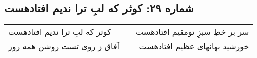 \begin{center}
\section*{شماره ۲۹: کوثر که لبِ ترا ندیم افتادهست}
\label{sec:029}
\begin{longtable}{l p{0.5cm} r}
کوثر که لبِ ترا ندیم افتادهست
&&
سر بر خطِ سبزِ تومقیم افتادهست
\\
آفاق ز روی تست روشن همه روز
&&
خورشید بهانهای عظیم افتادهست
\\
\end{longtable}
\end{center}
